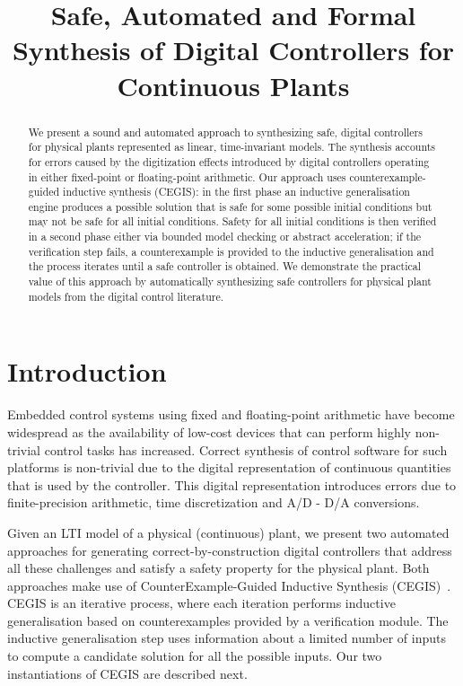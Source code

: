 \documentclass[submission]{eptcs}
\title{Safe, Automated and Formal Synthesis of Digital Controllers 
for Continuous Plants}
\begin{document}
\maketitle

\begin{abstract}
We present a sound and automated approach to synthesizing safe,
digital controllers for physical plants represented as linear,
time-invariant models. The synthesis
accounts for errors caused by the digitization effects introduced by
digital controllers operating in either fixed-point or floating-point arithmetic. 
Our approach uses counterexample-guided inductive
synthesis (CEGIS): in the first phase an inductive generalisation engine produces a
possible solution that is safe for some possible initial conditions but may
not be safe for all initial conditions. Safety for all initial conditions
is then verified in a second phase either
via bounded model checking or abstract acceleration; if the verification step fails, a
counterexample is provided to the inductive generalisation and the
process iterates until a safe controller is obtained.  We demonstrate
the practical value of this approach by automatically synthesizing
safe controllers for physical plant models from the digital control
literature.
\end{abstract}

\section{Introduction}

Embedded control systems using fixed and floating-point arithmetic 
have become widespread
as the availability of low-cost devices that can perform highly
non-trivial control tasks has increased. Correct synthesis of
control software for such platforms is non-trivial due to the digital representation of continuous quantities 
that is used by the controller. This digital representation introduces 
errors due to finite-precision arithmetic, time discretization and 
A/D - D/A conversions.


%
Given an LTI model of a physical (continuous) plant, we present two automated approaches for generating
correct-by-construction digital controllers that address all these
challenges and satisfy a safety property for the physical plant. 
Both approaches make use of CounterExample-Guided
Inductive Synthesis (CEGIS)~\cite{jha-icse10,
  DBLP:conf/asplos/Solar-LezamaTBSS06}.  CEGIS is an
iterative process, where each iteration performs inductive
generalisation based on counterexamples provided by a verification module. 
The inductive generalisation step uses information 
about a limited number of inputs to compute a candidate solution
for all the possible inputs. Our two instantiations of CEGIS are
described next.
\end{document}
